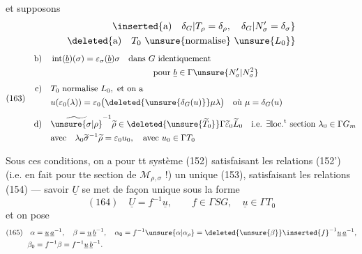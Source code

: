 et supposons 
\[
\begin{aligned}
\inserted{\text{a)}\quad\delta_G|T_\rho=\delta_\rho,\quad\delta_G|N'_\sigma=\delta_\sigma}\\
\deleted{\text{a)}\quad T_0\text{ \unsure{normalise} }\unsure{L_0}}
\end{aligned}
\]
\[
(163)\quad
\begin{aligned}
\text{b)}\quad&\operatorname{int}(\underline b)(\sigma)=\varepsilon_\sigma(\underline b)\sigma
\quad\text{dans }G\text{ identiquement}\\
&\hspace{12em}\text{pour }\underline b\in\Gamma\unsure{N'_\sigma|N^2_\sigma}\\[4pt]
\text{c)}\quad&T_0\text{ normalise }L_0,\text{ et on a}\\
&u(\varepsilon_0(\lambda))=
\varepsilon_0\bigl(\deleted{\unsure{\delta_G(u)}}\mu\lambda\bigr)
\quad\text{où }\mu=\delta_G(u)\\[4pt]
\text{d)}\quad&\widetilde{\unsure{\sigma|\rho}}^{-1}\widetilde\rho
\in\deleted{\unsure{\widetilde T_0}}\Gamma\widetilde\varepsilon_0\widetilde L_0
\quad\text{i.e. }\exists\text{loc.}^{\text{t}}\text{ section }\lambda_0\in\Gamma G_m\\
&\text{avec}\quad\lambda_0\widetilde\sigma^{-1}\widetilde\rho=\varepsilon_0u_0,
\quad\text{avec }u_0\in\Gamma T_0
\end{aligned}
\]

Sous ces conditions, on a pour tt système (152) satisfaisant les relations (152') (i.e. en fait pour tte  section de $\mathcal M_{\rho,\sigma}$ !) un unique  (153), satisfaisant les relations (154) --- savoir $\underline U$ se met de façon unique sous la forme
\[
(164)\quad\underline U=f^{-1}\underline u,\qquad f\in\Gamma SG,\quad\underline u\in\Gamma T_0
\]
et on pose
\[
\begin{aligned}
(165)\quad\alpha&=\underline u\,\underline a^{-1},\quad
\beta=\underline u\,\underline b^{-1},\quad
\alpha_0=f^{-1}\unsure{\alpha|\alpha_\rho}=
\deleted{\unsure{\beta}}\inserted{f}^{-1}\underline u\,\underline a^{-1},\\
\beta_0&=f^{-1}\beta=f^{-1}\underline u\,\underline b^{-1}.
\end{aligned}
\]

